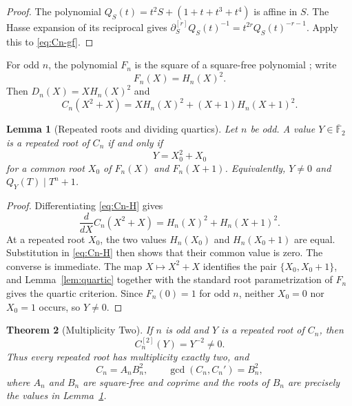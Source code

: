\documentclass[a4paper]{article}
\newtheorem{theorem}{Theorem}[section]
\newtheorem{lemma}[theorem]{Lemma}
\newcommand{\F}{\mathbb{F}}
\begin{document}
\begin{proof}
	The polynomial $Q_S(t)=t^2S+(1+t+t^3+t^4)$ is affine in $S$.
	The Hasse expansion of its reciprocal gives
	$\partial_S^{[r]}Q_S(t)^{-1}=t^{2r}Q_S(t)^{-r-1}$.
	Apply this to \eqref{eq:Cn-gf}.
\end{proof}

For odd $n$, the polynomial $F_n$ is the square of a square-free
polynomial \cite[Prop.~2.11]{HUNZIKER2004465}; write
\[
	F_n(X)=H_n(X)^2.
\]
Then $D_n(X)=XH_n(X)^2$ and
\begin{equation}\label{eq:Cn-H}
	C_n(X^2+X)=XH_n(X)^2+(X+1)H_n(X+1)^2.
\end{equation}

\begin{lemma}[Repeated roots and dividing quartics]\label{lem:Cn-repeated}
	Let $n$ be odd.  A value $Y\in\overline{\F}_2$ is a repeated root of
	$C_n$ if and only if
	\[
		Y=X_0^2+X_0
	\]
	for a common root $X_0$ of $F_n(X)$ and $F_n(X+1)$.  Equivalently,
	$Y\neq0$ and $Q_Y(T)\mid T^n+1$.
\end{lemma}

\begin{proof}
	Differentiating \eqref{eq:Cn-H} gives
	\[
		\frac{d}{dX}C_n(X^2+X)
		=H_n(X)^2+H_n(X+1)^2.
	\]
	At a repeated root $X_0$, the two values
	$H_n(X_0)$ and $H_n(X_0+1)$ are equal.  Substitution in
	\eqref{eq:Cn-H} then shows that their common value is zero.  The
	converse is immediate.  The map $X\mapsto X^2+X$ identifies the pair
	$\{X_0,X_0+1\}$, and Lemma~\ref{lem:quartic} together with the standard
	root parametrization of $F_n$ gives the quartic criterion.
	Since $F_n(0)=1$ for odd $n$, neither $X_0=0$ nor $X_0=1$ occurs, so
	$Y\neq0$.
\end{proof}

\begin{theorem}[Multiplicity Two]\label{thm:Cn-mult2}
	If $n$ is odd and $Y$ is a repeated root of $C_n$, then
	\begin{equation}\label{eq:Cn-second}
		C_n^{[2]}(Y)=Y^{-2}\neq0.
	\end{equation}
	Thus every repeated root has multiplicity exactly two, and
	\begin{equation}\label{eq:Cn-factor}
		C_n=A_nB_n^2,\qquad
		\gcd(C_n,C_n')=B_n^2,
	\end{equation}
	where $A_n$ and $B_n$ are square-free and coprime and the roots of
	$B_n$ are precisely the values in Lemma~\ref{lem:Cn-repeated}.
\end{theorem}
\end{document}
